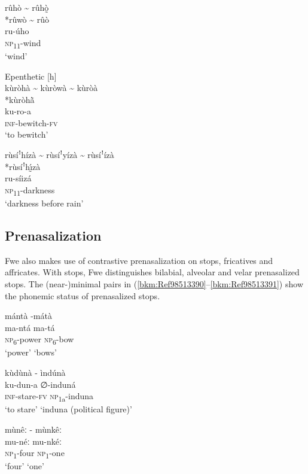 \ex
rûhò {\textasciitilde} rûhò̰\\
*rûwò {\textasciitilde} rûò\\
ru-úho\\
\textsc{np}\textsubscript{11}-wind\\
\glt ‘wind’
\z
\z

\ea
\label{bkm:Ref71645924}
  Epenthetic [h]  \\  
    \ea
    kùròhà {\textasciitilde} kùròwà {\textasciitilde} kùròà\\
    *kùròh\`{\~{a}}\\
    ku-ro-a\\
    \textsc{inf}-bewitch-\textsc{fv}\\
    \glt ‘to bewitch’
    
    \ex
    rùsíꜝhízà {\textasciitilde} rùsíꜝyízà {\textasciitilde} rùsíꜝízà\\
    *rùsíꜝh\'{ı}̰zà\\ %
    ru-síizá\\
    \textsc{np}\textsubscript{11}-darkness\\
    \glt ‘darkness before rain’
    \z
\z

\subsection{Prenasalization}

Fwe also makes use of contrastive prenasalization on stops, fricatives and affricates. With stops, Fwe distinguishes bilabial, alveolar and velar prenasalized stops. The (near-)minimal pairs in (\ref{bkm:Ref98513390}--\ref{bkm:Ref98513391}) show the phonemic status of prenasalized stops.

\ea
\label{bkm:Ref98513390}
mántà \tab     -\tab  mátà\\
ma-ntá   \tab\tab       ma-tá\\
\textsc{np}\textsubscript{6}-power  \tab\tab    \textsc{np}\textsubscript{6}-bow\\
\glt ‘power’ \tab\tab     ‘bows’
\z

\ea
kùdùnà \tab   - \tab ìndúnà\\
ku-dun-a  \tab\tab    ∅-induná\\
\textsc{inf}-stare-\textsc{fv} \tab\tab     \textsc{np}\textsubscript{1a}-induna\\
\glt ‘to stare’ \tab\tab     ‘induna (political figure)’
\z

\ea
mùnêː \tab     - \tab  mùnkêː\\
mu-néː  \tab\tab    mu-nkéː\\
\textsc{np}\textsubscript{1}-four \tab\tab     \textsc{np}\textsubscript{1}-one\\
\glt ‘four’  \tab\tab      ‘one’
\z


